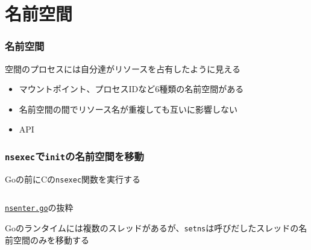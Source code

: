 \documentclass[unicode, 14pt, aspectratio=169]{beamer}
\begin{document}
\section{名前空間}
\begin{frame}[t]
  \frametitle{名前空間\supercite{namespaces}}
  \large
  空間のプロセスには自分達がリソースを占有したように見える
  \normalsize 
  \begin{itemize}[leftmargin=0.8cm,label=$\circ$]
    \item マウントポイント、プロセスIDなど6種類の名前空間がある
    \item 名前空間の間でリソース名が重複しても互いに影響しない
    \item API
    \end{itemize}
\end{frame}
\begin{frame}[t]
  \frametitle{\texttt{nsexec}で\texttt{init}の名前空間を移動}
  \large
  Goの前にCの\texttt{nsexec}関数を実行する
  \normalsize
  \begin{center}
    \inputminted{go}{code/nsenter.go}
    \href{https://github.com/opencontainers/runc/blob/7cb363254b69e10320360b63fb73e0ffb5da7bf2/libcontainer/nsenter/nsenter.go\#L12}{\texttt{nsenter.go}}の抜粋
  \end{center}
  Goのランタイムには複数のスレッドがあるが、\texttt{setns}は呼びだしたスレッドの名前空間のみを移動する\supercite{runc}
\end{frame}
\end{document}
